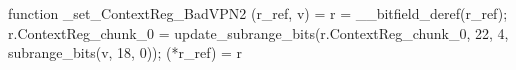 function _set_ContextReg_BadVPN2 (r_ref, v) = {
    r = __bitfield_deref(r_ref);
    r.ContextReg_chunk_0 = update_subrange_bits(r.ContextReg_chunk_0, 22, 4, subrange_bits(v, 18, 0));
    (*r_ref) = r
}
